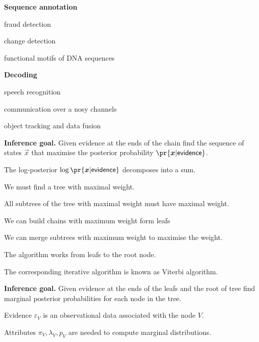 \documentclass[landscape,footrule]{foils}
\begin{document}
\textbf{Sequence annotation}
\begin{triangles}
\item fraud detection
\item change detection 
\item functional motifs of DNA sequences
\end{triangles}\vspace*{2ex}


\textbf{Decoding}
\begin{triangles}
\item speech recognition
\item communication over a nosy channels 
\item object tracking and data fusion
\end{triangles}



\textbf{Inference goal.}
Given evidence at the ends of the chain find the sequence of states $\vec{x}$ that maximise the posterior probability $\pr{\vec{x}|\mathsf{evidence}}$.
\begin{triangles}
\item The log-posterior $\log\pr{\vec{x}|\mathsf{evidence}}$ decomposes into a sum.
\item We must find a tree with maximal weight.
\end{triangles}



All subtrees of the tree with maximal weight must have maximal weight. 
\begin{triangles}
\item We can build chains with maximum weight form leafs
\item We can merge subtrees with maximum weight to maximise the weight.
\item The algorithm works from leafs to the root node.
\item The corresponding iterative algorithm is known as Viterbi algorithm.
\end{triangles}




\textbf{Inference goal.}
Given evidence at the ends of the leafs and the root of tree find marginal posterior probabilities for each node in the tree.
\begin{triangles}
\item Evidence $\varepsilon_V$ is an observational data associated with the node $V$.
\item Attributes $\pi_V, \lambda_V, p_V$ are needed to compute marginal distributions. 
\end{triangles}
\end{document}

